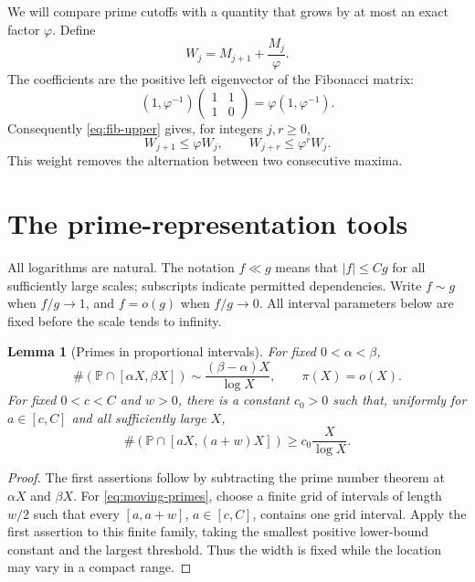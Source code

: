 \documentclass[11pt,letterpaper]{article}
\numberwithin{equation}{section}
\newtheorem{lemma}[theorem]{Lemma}
\theoremstyle{definition}
\theoremstyle{remark}
\newcommand{\Pp}{\mathbb P}
\newcommand{\ph}{\varphi}
\begin{document}
We will compare prime cutoffs with a quantity that grows by at most an
exact factor $\ph$. Define
\begin{equation}\label{eq:weight}
 W_j=M_{j+1}+\frac{M_j}{\ph}.
\end{equation}
The coefficients are the positive left eigenvector of the Fibonacci matrix:
\[
 (1,\ph^{-1})\begin{pmatrix}1&1\\1&0\end{pmatrix}
 =\ph(1,\ph^{-1}).
\]
Consequently \eqref{eq:fib-upper} gives, for integers $j,r\ge0$,
\begin{equation}\label{eq:weight-growth}
 W_{j+1}\le\ph W_j,\qquad W_{j+r}\le\ph^rW_j.
\end{equation}
This weight removes the alternation between two consecutive maxima.

\section{The prime-representation tools}
\label{sec:prime-tools}

All logarithms are natural. The notation $f\ll g$ means that $|f|\le Cg$
for all sufficiently large scales; subscripts indicate permitted dependencies.
Write $f\sim g$ when $f/g\to1$, and $f=o(g)$ when $f/g\to0$.
All interval parameters below are fixed before the scale tends to infinity.

\begin{lemma}[Primes in proportional intervals]\label{lem:primes}
For fixed $0<\alpha<\beta$,
\[
 \#(\Pp\cap[\alpha X,\beta X])
 \sim\frac{(\beta-\alpha)X}{\log X},\qquad \pi(X)=o(X).
\]
For fixed $0<c<C$ and $w>0$, there is a constant $c_0>0$ such that,
uniformly for $a\in[c,C]$ and all sufficiently large $X$,
\begin{equation}\label{eq:moving-primes}
 \#(\Pp\cap[aX,(a+w)X])\ge c_0\frac X{\log X}.
\end{equation}
\end{lemma}

\begin{proof}
The first assertions follow by subtracting the prime number theorem at
$\alpha X$ and $\beta X$. For \eqref{eq:moving-primes}, choose a finite
grid of intervals of length $w/2$ such that every $[a,a+w]$, $a\in[c,C]$,
contains one grid interval. Apply the first assertion to this finite family,
taking the smallest positive lower-bound constant and the largest threshold.
Thus the width is fixed while the location may vary in a compact range.
\end{proof}
\end{document}
